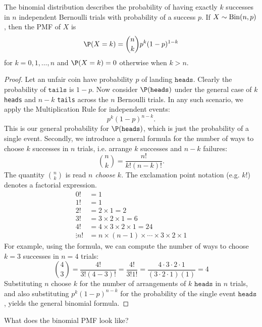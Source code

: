 \documentclass{ccg-topic}
\begin{document}
\begin{thm}
    \label{ex:derivation_of_the_binomial_pmf}
    The binomial distribution describes the probability of having exactly $k$ successes in $n$ independent Bernoulli trials with probability of a success $p$. If $X \sim \mathrm{Bin}(n,p)$, then the PMF of $X$ is 
\[
    \P(X=k) = {n \choose k} p^k(1-p)^{1-k}
\]
for $k = 0, 1, \ldots, n$ and $\P(X = k) = 0$ otherwise when $k > n$.
\end{thm}
\begin{proof}
Let an unfair coin have probability $p$ of landing $\mathtt{heads}$. Clearly the probability of $\mathtt{tails}$ is $1-p$. Now consider $\P(\mathtt{heads})$ under the general case of $k$ \texttt{heads} and $n-k$ \texttt{tails} across the $n$ Bernoulli trials. In any such scenario, we apply the Multiplication Rule for independent events:
\[
    p^k(1-p)^{n-k}.
\]
This is our general probability for $\P(\mathtt{heads})$, which is just the probability of a single event.
Secondly, we introduce a general formula for the number of ways to choose $k$ successes in $n$
trials, i.e. arrange $k$ successes and $n-k$ failures:
\[
    {n \choose k} = \frac{n!}{k!(n-k)!}.
\]
The quantity ${n \choose k}$ is read \emph{$n$ choose $k$}. The exclamation point notation (e.g. $k!$) denotes a factorial expression.
\begin{align*}
0! &= 1\\
1! &= 1\\
2! &= 2 \times 1 = 2\\
3! &= 3 \times 2 \times 1 = 6\\
4! &= 4 \times 3 \times 2 \times 1 = 24\\
\vdots
n! &= n \times (n-1) \times \cdots \times 3 \times 2 \times 1
\end{align*}
For example, using the formula, we can compute the number of ways to choose $k=3$ successes in $n=4$ trials:
\begin{equation*}
    {4 \choose 3} = \frac{4!}{3!(4-3)!} = \frac{4!}{3!1!} = \frac{4\cdot 3 \cdot 2 \cdot 1}{(3\cdot 2 \cdot 1)(1)} = 4
\end{equation*}
Substituting $n$ choose $k$ for the number of arrangements of $k$ $\mathtt{heads}$ in $n$ trials, and also substituting $p^k(1-p)^{n-k}$ for the probability of the single event $\mathtt{heads}$, yields the general binomial formula.
\end{proof}

What does the binomial PMF look like?
\end{document}
